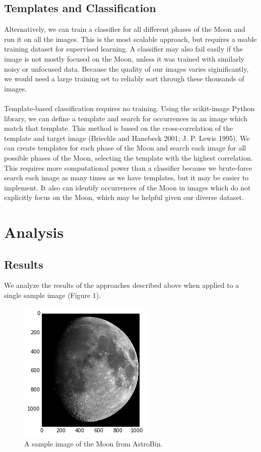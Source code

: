 \documentclass[]{article}
\begin{document}
\subsection*{Templates and Classification}
Alternatively, we can train a classifier for all different phases of the Moon and run it on all the images. This is the most scalable approach, but requires a usable training dataset for supervised learning. A classifier may also fail easily if the image is not mostly focused on the Moon, unless it was trained with similarly noisy or unfocused data. Because the quality of our images varies siginificantly, we would need a large training set to reliably sort through these thousands of images.
\\\\
Template-based classification requires no training. Using the scikit-image Python library, we can define a template and search for occurrences in an image which match that template. This method is based on the cross-correlation of the template and target image (Briechle and Hanebeck 2001; J. P. Lewis 1995). We can create templates for each phase of the Moon and search each image for all possible phases of the Moon, selecting the template with the highest correlation. This requires more computational power than a classifier because we brute-force search each image as many times as we have templates, but it may be easier to implement. It also can identify occurrences of the Moon in images which do not explicitly focus on the Moon, which may be helpful given our diverse dataset.
\pagebreak
\section*{Analysis}
\subsection*{Results}
We analyze the results of the approaches described above when applied to a single sample image (Figure 1).
\begin{figure}[h]
\centering
\includegraphics{sample_moon}
\caption{A sample image of the Moon from AstroBin.}
\end{figure}
\end{document}
